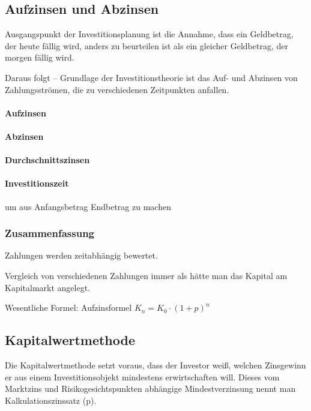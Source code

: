 \clearpage
\subsection{Aufzinsen und Abzinsen}
Ausgangspunkt der Investitionsplanung ist die Annahme, dass ein Geldbetrag, der {\flqq heute\frqq} fällig wird, anders zu beurteilen ist als ein gleicher Geldbetrag, der {\flqq morgen\frqq} fällig wird.

Daraus folgt -- Grundlage der Investitionstheorie ist das Auf- und Abzinsen von Zahlungsströmen, die zu verschiedenen Zeitpunkten anfallen.

\paragraph{Aufzinsen}

\paragraph{Abzinsen}

\paragraph{Durchschnittszinsen}

\paragraph{Investitionszeit} um aus Anfangsbetrag Endbetrag zu machen

\clearpage
\subsubsection{Zusammenfassung}
\begin{compactitem}
	\item Zahlungen werden zeitabhängig bewertet.
	\item Vergleich von verschiedenen Zahlungen immer als hätte man das Kapital am Kapitalmarkt angelegt.
	\item Wesentliche Formel: Aufzinsformel $K_n=K_0\cdot(1+p)^n$
\end{compactitem}

\subsection{Kapitalwertmethode}
Die Kapitalwertmethode setzt voraus, dass der Investor weiß, welchen {\flqq Zinsgewinn\frqq} er aus einem Investitionsobjekt mindestens erwirtschaften will. Dieses vom Marktzins und Risikogesichtspunkten abhängige Mindestverzinsung nennt man Kalkulationszinssatz (p).

